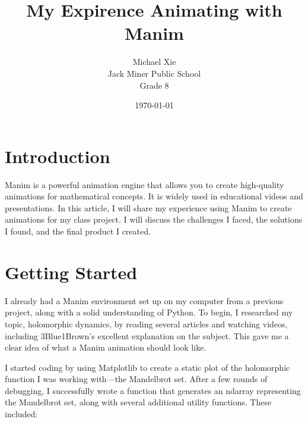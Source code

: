 \documentclass{article}
\title{My Expirence Animating with Manim}
\author{Michael Xie \\ Jack Miner Public School \\ Grade 8}
\date{\today}
\begin{document}
\maketitle

\section{Introduction}
Manim is a powerful animation engine that allows you to create high-quality animations for mathematical concepts. It is widely used in educational videos and presentations. In this article, I will share my experience using Manim 
to create animations for my class project. I will discuss the challenges I faced, the solutions I found, and the final product I created.

\section{Getting Started}
I already had a Manim environment set up on my computer from a previous project, along with a solid understanding of Python. To begin, I researched my topic, holomorphic dynamics, by reading several articles and watching videos, including 3Blue1Brown's excellent explanation on the subject. This gave me a clear idea of what a Manim animation should look like. 

I started coding by using Matplotlib to create a static plot of the holomorphic function I was working with—the Mandelbrot set. After a few rounds of debugging, I successfully wrote a function that generates an ndarray representing the Mandelbrot set, along with several additional utility functions. These included:
\end{document}

